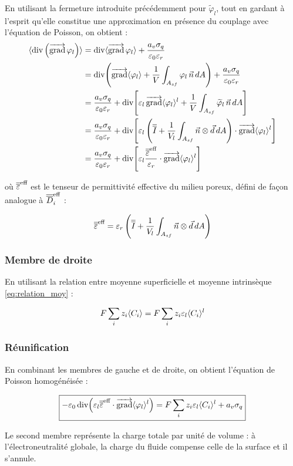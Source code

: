 En utilisant la fermeture introduite précédemment pour
$\widetilde{\varphi}_l$, tout en gardant à l'esprit qu'elle constitue
une approximation en présence du couplage avec l'équation de Poisson,
on obtient :
\begin{align}
\langle \operatorname{div}\left(\mathop{\overrightarrow{\operatorname{grad}}}\nolimits\varphi_l\right) \rangle
&= \operatorname{div}\langle \mathop{\overrightarrow{\operatorname{grad}}}\nolimits\varphi_l \rangle + \frac{a_v \sigma_q}{\varepsilon_0 \varepsilon_r} \notag\\
&= \operatorname{div}\!\left(\mathop{\overrightarrow{\operatorname{grad}}}\nolimits\langle \varphi_l \rangle + \frac{1}{V}\int_{A_{sf}} \varphi_l\,\vec{n}\, dA\right)
+ \frac{a_v \sigma_q}{\varepsilon_0 \varepsilon_r} \notag\\
&= \frac{a_v \sigma_q}{\varepsilon_0 \varepsilon_r}
+ \operatorname{div}\!\left[\varepsilon_l \mathop{\overrightarrow{\operatorname{grad}}}\nolimits\langle \varphi_l \rangle^l
+ \frac{1}{V}\int_{A_{sf}} \widetilde{\varphi}_l\,\vec{n}\, dA\right] \notag\\
&= \frac{a_v \sigma_q}{\varepsilon_0 \varepsilon_r}
+ \operatorname{div}\!\left[\varepsilon_l
\left(\overline{\overline{I}} + \frac{1}{V_l}\int_{A_{sf}} \vec{n}\otimes\vec{d}\, dA\right)\cdot\mathop{\overrightarrow{\operatorname{grad}}}\nolimits\langle \varphi_l \rangle^l\right] \notag\\
&= \frac{a_v \sigma_q}{\varepsilon_0 \varepsilon_r}
+ \operatorname{div}\!\left[\varepsilon_l \frac{\overline{\overline{\varepsilon}}^{\text{eff}}}{\varepsilon_r}\cdot\mathop{\overrightarrow{\operatorname{grad}}}\nolimits\langle \varphi_l \rangle^l\right]
\end{align}

où $\overline{\overline{\varepsilon}}^{\text{eff}}$ est le tenseur de permittivité effective du milieu poreux,
défini de façon analogue à $\overline{\overline{D}}_i^{\mathrm{eff}}$ :

\begin{equation}
\overline{\overline{\varepsilon}}^{\text{eff}} = \varepsilon_r \left(\overline{\overline{I}} + \frac{1}{V_l}\int_{A_{sf}} \vec{n}\otimes\vec{d}\, dA\right)
\end{equation}

\subsubsection*{Membre de droite}

En utilisant la relation entre moyenne superficielle et moyenne intrinsèque
\eqref{eq:relation_moy} :

\begin{equation}
F\sum_i z_i \langle C_i \rangle = F\sum_i z_i \varepsilon_l \langle C_i \rangle^l
\end{equation}

\subsubsection*{Réunification}

En combinant les membres de gauche et de droite, on obtient l'équation
de Poisson homogénéisée :

\begin{equation}
\boxed{
-\varepsilon_0 \operatorname{div}\!\left(\varepsilon_l \overline{\overline{\varepsilon}}^{\text{eff}}\cdot\mathop{\overrightarrow{\operatorname{grad}}}\nolimits\langle \varphi_l \rangle^l\right)
= F\sum_i z_i \varepsilon_l \langle C_i \rangle^l + a_v \sigma_q
}
\label{eq:poisson_homo}
\end{equation}

Le second membre représente la charge totale par unité de volume : à
l'électroneutralité globale, la charge du fluide compense celle de la surface et il s'annule.